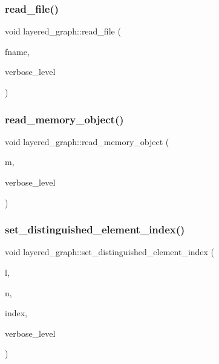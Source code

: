\subsubsection{\texorpdfstring{read\+\_\+file()}{read\_file()}}
{\footnotesize\ttfamily void layered\+\_\+graph\+::read\+\_\+file (\begin{DoxyParamCaption}\item[{const \mbox{\hyperlink{galois_8h_ab6cc7b4aeb6ea31aba2b3fbfc83ff5e6}{B\+Y\+TE}} $\ast$}]{fname,  }\item[{\mbox{\hyperlink{galois_8h_a09fddde158a3a20bd2dcadb609de11dc}{I\+NT}}}]{verbose\+\_\+level }\end{DoxyParamCaption})}

\mbox{\label{classlayered__graph_a878db4284f9bc575020df526d7a0bce5}} 
\subsubsection{\texorpdfstring{read\+\_\+memory\+\_\+object()}{read\_memory\_object()}}
{\footnotesize\ttfamily void layered\+\_\+graph\+::read\+\_\+memory\+\_\+object (\begin{DoxyParamCaption}\item[{\mbox{\hyperlink{classmemory__object}{memory\+\_\+object}} $\ast$}]{m,  }\item[{\mbox{\hyperlink{galois_8h_a09fddde158a3a20bd2dcadb609de11dc}{I\+NT}}}]{verbose\+\_\+level }\end{DoxyParamCaption})}

\mbox{\label{classlayered__graph_a1eaa49d10447a6c84db40477df26519d}} 
\subsubsection{\texorpdfstring{set\+\_\+distinguished\+\_\+element\+\_\+index()}{set\_distinguished\_element\_index()}}
{\footnotesize\ttfamily void layered\+\_\+graph\+::set\+\_\+distinguished\+\_\+element\+\_\+index (\begin{DoxyParamCaption}\item[{\mbox{\hyperlink{galois_8h_a09fddde158a3a20bd2dcadb609de11dc}{I\+NT}}}]{l,  }\item[{\mbox{\hyperlink{galois_8h_a09fddde158a3a20bd2dcadb609de11dc}{I\+NT}}}]{n,  }\item[{\mbox{\hyperlink{galois_8h_a09fddde158a3a20bd2dcadb609de11dc}{I\+NT}}}]{index,  }\item[{\mbox{\hyperlink{galois_8h_a09fddde158a3a20bd2dcadb609de11dc}{I\+NT}}}]{verbose\+\_\+level }\end{DoxyParamCaption})}

